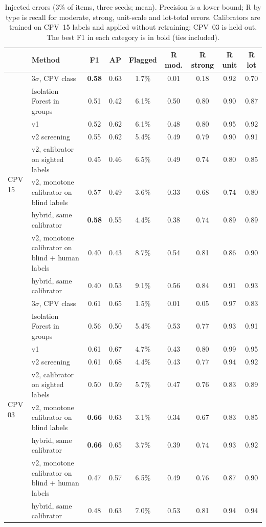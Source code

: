 \documentclass[conference]{IEEEtran}
\begin{document}
\begin{table}[t]
\centering
\caption{Injected errors (3\% of items, three seeds; mean). Precision is a lower bound; R by type is
recall for moderate, strong, unit-scale and lot-total errors. Calibrators are trained on CPV~15 labels and
applied without retraining; CPV~03 is held out. The best F1 in each category is in bold (ties included).}
\label{tab:synthetic}
\small
\setlength{\tabcolsep}{4pt}
\begin{tabular}{llccccccc}
\toprule
 & Method & F1 & AP & Flagged & R mod. & R strong & R unit & R lot \\
\midrule
\multirow{9}{*}{CPV 15}
 & 3$\sigma$, CPV class & \textbf{0.58} & 0.63 & 1.7\% & 0.01 & 0.18 & 0.92 & 0.70 \\
 & Isolation Forest in groups & 0.51 & 0.42 & 6.1\% & 0.50 & 0.80 & 0.90 & 0.87 \\
 & v1 & 0.52 & 0.62 & 6.1\% & 0.48 & 0.80 & 0.95 & 0.92 \\
 & v2 screening & 0.55 & 0.62 & 5.4\% & 0.49 & 0.79 & 0.90 & 0.91 \\
 & v2, calibrator on sighted labels & 0.45 & 0.46 & 6.5\% & 0.49 & 0.74 & 0.80 & 0.85 \\
 & v2, monotone calibrator on blind labels & 0.57 & 0.49 & 3.6\% & 0.33 & 0.68 & 0.74 & 0.80 \\
 & hybrid, same calibrator & \textbf{0.58} & 0.55 & 4.4\% & 0.38 & 0.74 & 0.89 & 0.89 \\
 & v2, monotone calibrator on blind + human labels & 0.40 & 0.43 & 8.7\% & 0.54 & 0.81 & 0.86 & 0.90 \\
 & hybrid, same calibrator & 0.40 & 0.53 & 9.1\% & 0.56 & 0.84 & 0.91 & 0.93 \\
\midrule
\multirow{9}{*}{CPV 03}
 & 3$\sigma$, CPV class & 0.61 & 0.65 & 1.5\% & 0.01 & 0.05 & 0.97 & 0.83 \\
 & Isolation Forest in groups & 0.56 & 0.50 & 5.4\% & 0.53 & 0.77 & 0.93 & 0.91 \\
 & v1 & 0.61 & 0.67 & 4.7\% & 0.43 & 0.80 & 0.99 & 0.95 \\
 & v2 screening & 0.61 & 0.68 & 4.4\% & 0.43 & 0.77 & 0.94 & 0.92 \\
 & v2, calibrator on sighted labels & 0.50 & 0.59 & 5.7\% & 0.47 & 0.76 & 0.83 & 0.89 \\
 & v2, monotone calibrator on blind labels & \textbf{0.66} & 0.63 & 3.1\% & 0.34 & 0.67 & 0.83 & 0.85 \\
 & hybrid, same calibrator & \textbf{0.66} & 0.65 & 3.7\% & 0.39 & 0.74 & 0.93 & 0.92 \\
 & v2, monotone calibrator on blind + human labels & 0.47 & 0.57 & 6.5\% & 0.49 & 0.76 & 0.87 & 0.90 \\
 & hybrid, same calibrator & 0.48 & 0.63 & 7.0\% & 0.53 & 0.81 & 0.94 & 0.94 \\
\bottomrule
\end{tabular}
\end{table}
\end{document}
